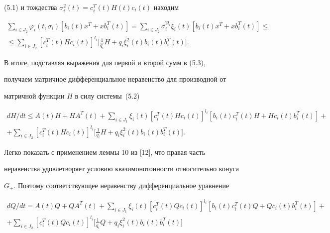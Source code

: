 (5.1) и тождества $\sigma^2_i(t)=c^T_i(t)H(t)c_i(t)$ находим 


\begin{multline*} 


\sum_{i\in J_2}\varphi_i(t,\sigma_i)[b_i(t)x^T+x b^T_i(t)]= 


\sum_{i\in J_2}\sigma^{2l_i}_i \xi_i(t)[b_i(t)x^T+x b^T_i(t)]\le \\ 


% 


\le\sum_{i\in J_2}[c^T_i(t)H c_i(t)]^{l_i}\bigg[ 


\frac{1}{q_i}H+q_i \xi^2_i(t)b_i(t)b^T_i(t)\bigg]. 


\end{multline*} 


 


В итоге, подставляя выражения для первой и второй сумм в (5.3), 


получаем матричное дифференциальное неравенство для производной от 


матричной функции $H$ в силу системы~(5.2) 


\begin{multline*} 


d H/d t\le A(t)H+H A^T(t)+\sum_{i\in J_1}\xi_i(t) 


[c^T_i(t)H c_i(t)]^{l_i}[b_i(t)c^T_i(t)H+ 


H c_i(t)b^T_i(t)]+ \\ 


% 


+\sum_{i\in J_2}[c^T_i(t)H c_i(t)]^{l_i}\bigg[ 


\frac{1}{q_i}H+q_i \xi^2_i(t)b_i(t)b^T_i(t)\bigg]. 


\end{multline*} 


Легко показать с применением леммы 10 из [12], что правая часть 


неравенства удовлетворяет условию квазимонотонности относительно конуса 


$G_+$. Поэтому соответствующее неравенству дифференциальное уравнение 


\begin{multline} 


d Q/d t=A(t)Q+Q A^T(t)+\sum_{i\in J_1}\xi_i(t)[c^T_i(t) 


Q c_i(t)]^{l_i}[b_i(t)c^T_i(t)Q+ Q c_i(t)b^T_i(t)]+ \\ 


% 


+\sum_{i\in J_2}[c^T_i(t)Q c_i(t)]^{l_i}\bigg[ 


\frac{1}{q_i}Q+q_i \xi^2_i(t)b_i(t)b^T_i(t)\bigg] 


\end{multline} 


